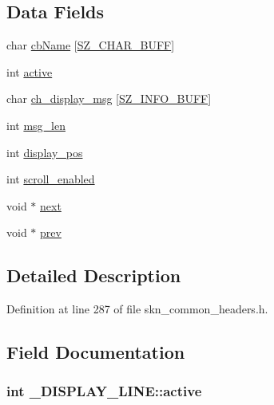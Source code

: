 \subsection*{Data Fields}
\begin{DoxyCompactItemize}
\item 
char \hyperlink{struct___d_i_s_p_l_a_y___l_i_n_e_a3a374d209578adb1d4cea933756fb14a}{cb\+Name} \mbox{[}\hyperlink{skn__common__headers_8h_a8d2978ad614b0de81c60483e706d9306}{S\+Z\+\_\+\+C\+H\+A\+R\+\_\+\+B\+U\+F\+F}\mbox{]}
\item 
int \hyperlink{struct___d_i_s_p_l_a_y___l_i_n_e_acf235d7965b9d52439add787b8e3d316}{active}
\item 
char \hyperlink{struct___d_i_s_p_l_a_y___l_i_n_e_ae5fae9b599281d1d3f619b6e402e7c2c}{ch\+\_\+display\+\_\+msg} \mbox{[}\hyperlink{skn__common__headers_8h_a442d5e93bd9c9d8eb4532aba62b5f86c}{S\+Z\+\_\+\+I\+N\+F\+O\+\_\+\+B\+U\+F\+F}\mbox{]}
\item 
int \hyperlink{struct___d_i_s_p_l_a_y___l_i_n_e_aa9cfa1dd3e90386f675fef61e711342e}{msg\+\_\+len}
\item 
int \hyperlink{struct___d_i_s_p_l_a_y___l_i_n_e_af32b1aa2ce817c27695d7cd43db9364d}{display\+\_\+pos}
\item 
int \hyperlink{struct___d_i_s_p_l_a_y___l_i_n_e_ad92346a9708f3f3ba0c45dfb891c18e3}{scroll\+\_\+enabled}
\item 
void $\ast$ \hyperlink{struct___d_i_s_p_l_a_y___l_i_n_e_a0668a4de4eb91d9bbd03cc52b00f4fd0}{next}
\item 
void $\ast$ \hyperlink{struct___d_i_s_p_l_a_y___l_i_n_e_aadc57636aadef3cff11443217e7f50e5}{prev}
\end{DoxyCompactItemize}


\subsection{Detailed Description}


Definition at line 287 of file skn\+\_\+common\+\_\+headers.\+h.



\subsection{Field Documentation}
\hypertarget{struct___d_i_s_p_l_a_y___l_i_n_e_acf235d7965b9d52439add787b8e3d316}{
\subsubsection[{active}]{\setlength{\rightskip}{0pt plus 5cm}int \+\_\+\+D\+I\+S\+P\+L\+A\+Y\+\_\+\+L\+I\+N\+E\+::active}}\label{struct___d_i_s_p_l_a_y___l_i_n_e_acf235d7965b9d52439add787b8e3d316}


